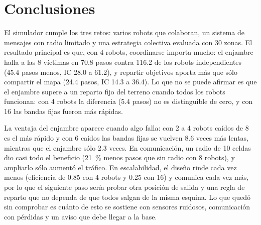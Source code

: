 \documentclass[11pt,letterpaper]{article}
\begin{document}
\section{Conclusiones}

El simulador cumple los tres retos: varios robots que colaboran, un sistema de mensajes con radio limitado y una estrategia colectiva evaluada con 30 zonas. El resultado principal es que, con 4 robots, coordinarse importa mucho: el enjambre halla a las 8 víctimas en 70.8 pasos contra 116.2 de los robots independientes (45.4 pasos menos, IC 28.0 a 61.2), y repartir objetivos aporta más que sólo compartir el mapa (24.4 pasos, IC 14.3 a 36.4). Lo que no se puede afirmar es que el enjambre supere a un reparto fijo del terreno cuando todos los robots funcionan: con 4 robots la diferencia (5.4 pasos) no es distinguible de cero, y con 16 las bandas fijas fueron más rápidas.

La ventaja del enjambre aparece cuando algo falla: con 2 a 4 robots caídos de 8 es el más rápido y con 6 caídos las bandas fijas se vuelven 8.6 veces más lentas, mientras que el enjambre sólo 2.3 veces. En comunicación, un radio de 10 celdas dio casi todo el beneficio (21~\% menos pasos que sin radio con 8 robots), y ampliarlo sólo aumentó el tráfico. En escalabilidad, el diseño rinde cada vez menos (eficiencia de 0.85 con 4 robots y 0.25 con 16) y comunica cada vez más, por lo que el siguiente paso sería probar otra posición de salida y una regla de reparto que no dependa de que todos salgan de la misma esquina. Lo que quedó sin comprobar es cuánto de esto se sostiene con sensores ruidosos, comunicación con pérdidas y un aviso que debe llegar a la base.

\end{document}
